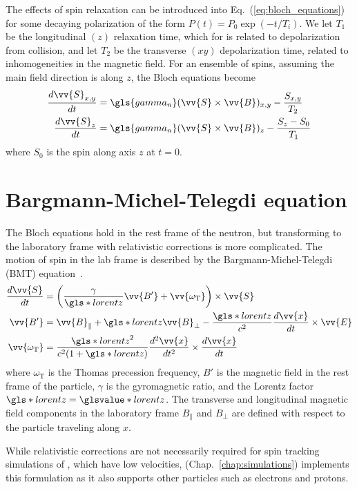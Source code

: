 The effects of spin relaxation can be introduced into Eq.~(\ref{eq:bloch_equations}) for some decaying polarization of the form $P(t)=P_0 \exp(-t/T_i)$. We let $T_1$ be the longitudinal $(z)$ relaxation time, which for \ucn is related to depolarization from collision, and let $T_2$ be the transverse $(xy)$ depolarization time, related to inhomogeneities in the magnetic field. For an ensemble of spins, assuming the main field direction is along $z$, the Bloch equations become
%
\begin{align}
    \frac{d\vv{S}_{x,y}}{dt} &= \gls{gamma_n} (\vv{S} \times \vv{B})_{x,y}-\frac{S_{x,y}}{T_2} \\
    \frac{d\vv{S}_z}{dt} &= \gls{gamma_n} (\vv{S} \times \vv{B})_{z}-\frac{S_z-S_0}{T_1}
\end{align}
%
where $S_0$ is the spin along axis $z$ at $t=0$.


\section{Bargmann-Michel-Telegdi equation}\label{sec:BMT_equations}


The Bloch equations hold in the rest frame of the neutron, but transforming to the laboratory frame with relativistic corrections is more complicated. The motion of spin in the lab frame is described by the Bargmann-Michel-Telegdi (BMT) equation~\cite{bmt_equations}.
%
\begin{align}
    \frac{d\vv{S}}{dt} &= \left( \frac{\gamma}{\gls*{lorentz}}\vv{B'}+\vv{\omega_\text{T}}\right)\times \vv{S}\\
    \vv{B'} &= \vv{B}_\parallel + \gls*{lorentz}\vv{B}_\perp - \frac{\gls*{lorentz}}{c^2}\frac{d\vv{x}}{dt}\times\vv{E}\\
    \vv{\omega_\text{T}}&=\frac{\gls*{lorentz}^2}{c^2(1+\gls*{lorentz})}\frac{d^2\vv{x}}{dt^2}\times\frac{d\vv{x}}{dt}
\end{align}
%
where $\omega_\text{T}$ is the Thomas precession frequency, $B'$ is the magnetic field in the rest frame of the particle, $\gamma$ is the gyromagnetic ratio, and the Lorentz factor $\gls*{lorentz}=\glsvalue*{lorentz}$. The transverse and longitudinal magnetic field components in the laboratory frame $B_\parallel$ and $B_\perp$ are defined with respect to the particle traveling along $x$.

While relativistic corrections are not necessarily required for spin tracking simulations of \ucn, which have low velocities, \pentrack (Chap.~\ref{chap:simulations}) implements this formulation as it also supports other particles such as electrons and protons.